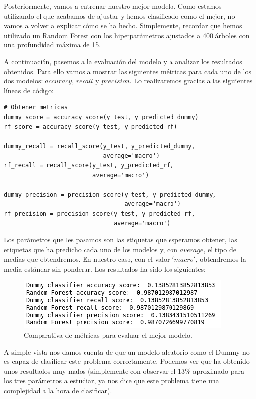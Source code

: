 \documentclass[11pt,a4paper]{article}
\begin{document}
Posteriormente, vamos a entrenar nuestro mejor modelo. Como estamos utilizando el que acabamos de ajustar y hemos clasificado como el mejor, no vamos a volver a explicar cómo se ha hecho. Simplemente, recordar que hemos utilizado un Random Forest con los hiperparámetros ajustados a 400 árboles con una profundidad máxima de 15.

A continuación, pasemos a la evaluación del modelo y a analizar los resultados obtenidos. Para ello vamos a mostrar las siguientes métricas para cada uno de los dos modelos: $accuracy$, $recall$ y $precision$. Lo realizaremos gracias a las siguientes líneas de código:

\begin{lstlisting}
# Obtener metricas
dummy_score = accuracy_score(y_test, y_predicted_dummy)
rf_score = accuracy_score(y_test, y_predicted_rf)

dummy_recall = recall_score(y_test, y_predicted_dummy,
                            average='macro')
rf_recall = recall_score(y_test, y_predicted_rf,
                         average='macro')

dummy_precision = precision_score(y_test, y_predicted_dummy,
                                  average='macro')
rf_precision = precision_score(y_test, y_predicted_rf,
                               average='macro')
\end{lstlisting}

Los parámetros que les pasamos son las etiquetas que esperamos obtener, las etiquetas que ha predicho cada uno de los modelos y, con $average$, el tipo de medias que obtendremos. En nuestro caso, con el valor $'macro'$, obtendremos la media estándar sin ponderar. Los resultados ha sido los siguientes:

\begin{figure}[H]
    \centering
    \includegraphics{img/model-comp-scores.png}
    \caption{Comparativa de métricas para evaluar el mejor modelo.}
    \label{fig:model-comp-scores}
\end{figure}

A simple vista nos damos cuenta de que un modelo aleatorio como el Dummy no es capaz de clasificar este problema correctamente. Podemos ver que ha obtenido unos resultados muy malos (simplemente con observar el $13\%$ aproximado para los tres parámetros a estudiar, ya nos dice que este problema tiene una complejidad a la hora de clasificar).
\end{document}

